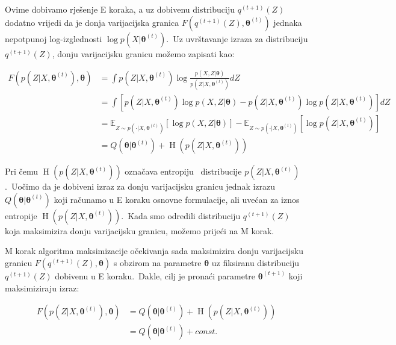 \documentclass[diplomskirad]{fer}
\begin{document}
Ovime dobivamo rješenje E koraka, a uz dobivenu distribuciju $q^{(t + 1)}(Z)$ dodatno vrijedi da je donja varijacijska granica $F(q^{(t + 1)}(Z), \bm{\theta}^{(t)})$ jednaka nepotpunoj log-izglednosti $\log p(X | \bm{\theta}^{(t)})$.\ 
Uz uvrštavanje izraza za distribuciju $q^{(t + 1)}(Z)$, donju varijacijsku granicu možemo zapisati kao:

\begin{equation}
  \begin{aligned}
    F(p(Z | X, \bm{\theta}^{(t)}), \bm{\theta}) &= \int p(Z | X, \bm{\theta}^{(t)}) \log \frac{p(X, Z | \bm{\theta})}{p(Z | X, \bm{\theta}^{(t)})} dZ \\
                         &= \int \left[ p(Z | X, \bm{\theta}^{(t)}) \log p(X, Z | \bm{\theta}) - p(Z | X, \bm{\theta}^{(t)}) \log p(Z | X, \bm{\theta}^{(t)}) \right] dZ \\
                         &= \mathbb{E}_{Z \sim p(\cdot | X, \bm{\theta}^{(t)})} \left[ \log p(X, Z | \bm{\theta}) \right] - \mathbb{E}_{Z \sim p(\cdot | X, \bm{\theta}^{(t)})} \left[\log p(Z | X, \bm{\theta}^{(t)}) \right] \\
                         &= Q(\bm{\theta} | \bm{\theta}^{(t)}) + \operatorname{H}(p(Z | X, \bm{\theta}^{(t)}))
  \end{aligned}
  \label{eq:em_equality_of_e_step}
\end{equation}

Pri čemu $\operatorname{H}(p(Z | X, \bm{\theta}^{(t)}))$ označava entropiju~\cite{renyi1961measures} distribucije $p(Z | X, \bm{\theta}^{(t)})$.\ Uočimo da je dobiveni izraz za donju varijacijsku granicu jednak izrazu $Q(\bm{\theta} | \bm{\theta}^{(t)})$ koji računamo u E koraku osnovne formulacije, ali uvećan za iznos entropije $\operatorname{H}(p(Z | X, \bm{\theta}^{(t)}))$.\ 
Kada smo odredili distribuciju $q^{(t + 1)}(Z)$ koja maksimizira donju varijacijsku granicu, možemo prijeći na M korak.\ 

M korak algoritma maksimizacije očekivanja sada maksimizira donju varijacijsku granicu $F(q^{(t + 1)}(Z), \bm{\theta})$ s obzirom na parametre $\bm{\theta}$ uz fiksiranu distribuciju $q^{(t + 1)}(Z)$ dobivenu u E koraku.\
Dakle, cilj je pronaći parametre $\bm{\theta}^{(t + 1)}$ koji maksimiziraju izraz:

\begin{equation}
  \begin{aligned}
    F(p(Z | X, \bm{\theta}^{(t)}), \bm{\theta}) &= Q(\bm{\theta} | \bm{\theta}^{(t)}) + \operatorname{H}(p(Z | X, \bm{\theta}^{(t)})) \\ 
                                                &= Q(\bm{\theta} | \bm{\theta}^{(t)}) + const. \\
  \end{aligned}
  \label{eq:em_m_step_general}
\end{equation}
\end{document}
